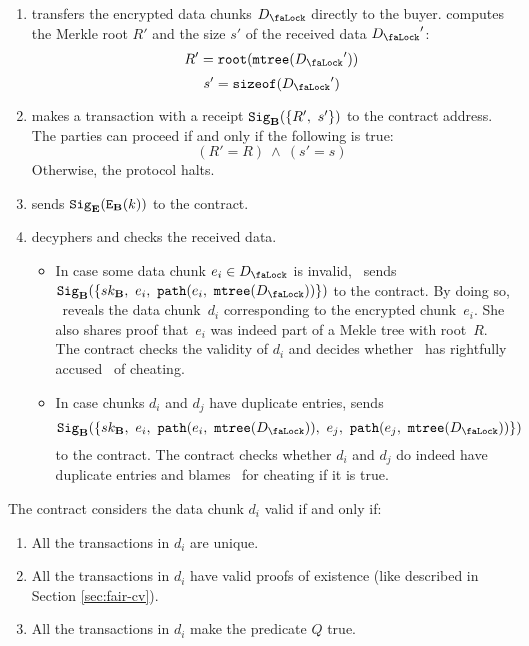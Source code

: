 \begin{enumerate}
\item {} transfers the encrypted data chunks $\Lock{D}$ directly to the buyer.  computes the Merkle root $R'$ and the size $s'$ of the received data $\Lock{D}'$:
\begin{equation}
R' = \Root(\MerkleTree(\Lock{D}'))
\end{equation}
\begin{equation}
s' = \SizeOf(\Lock{D}')
\end{equation}
\item \label{step:buyers-receipt}  makes a transaction with a receipt $\mathtt{Sig}_{\mathbf{B}}(\{R',\ s'\})$ to the contract address. The parties can proceed if and only if the following is true:
\begin{equation}
(R' = R)\ \land\ (s' = s)
\end{equation}
Otherwise, the protocol halts.
\item \label{step:secret-sharing}  sends $\mathtt{Sig}_{\mathbf{E}}(\mathtt{E}_{\mathbf{B}}(k))$ to the contract.
\item \label{step:arbitrage}  decyphers and checks the received data.
\begin{itemize}
\item In case some data chunk $e_i \in \Lock{D}$ is invalid, ~sends $\Sign_\Party{B}(\{\SecretKey{B},\ e_i,\ \Path(e_i,\ \MerkleTree(\Lock{D}))\})$ to the contract. By doing so, ~reveals the data chunk~$d_i$ corresponding to the encrypted chunk~$e_i$. She also shares proof that~$e_i$ was indeed part of a  Mekle tree with root~$R$. The contract checks the validity of $d_i$ and decides whether ~has rightfully accused~ of cheating.
\item In case chunks $d_i$ and $d_j$ have duplicate entries,  sends $$\Sign_\Party{B}(\{\SecretKey{B},\ e_i,\ \Path(e_i,\ \MerkleTree(\Lock{D})),\ e_j,\ \Path(e_j,\ \MerkleTree(\Lock{D}))\})$$ to the contract. The contract checks whether $d_i$ and $d_j$ do indeed have duplicate entries and blames~ for cheating if it is true.
\end{itemize}
\end{enumerate}

The contract considers the data chunk $d_i$ valid if and only if:
\begin{enumerate}
\item All the transactions in $d_i$ are unique.
\item All the transactions in $d_i$ have valid proofs of existence (like described in Section \ref{sec:fair-cv}).
\item All the transactions in $d_i$ make the predicate $Q$ true.
\end{enumerate}


